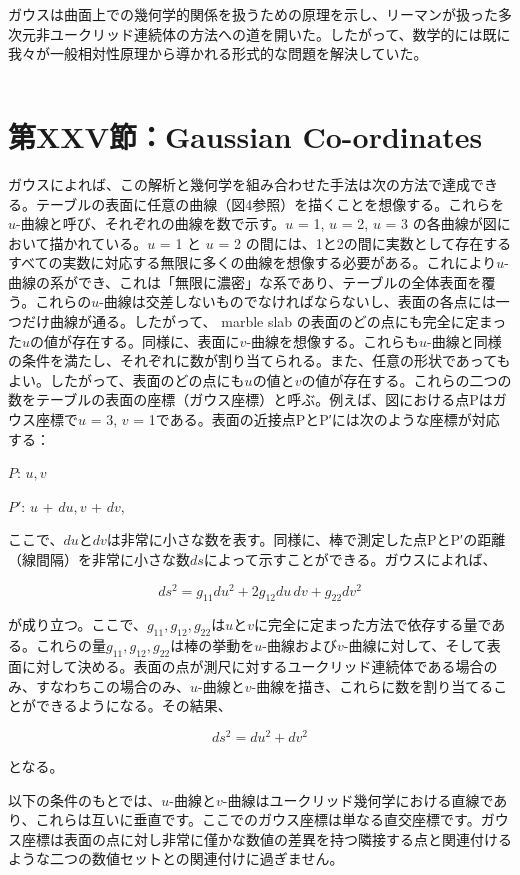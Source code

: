 \documentclass[a4paper,11pt,openany]{ltjsbook}
\begin{document}
ガウスは曲面上での幾何学的関係を扱うための原理を示し、リーマンが扱った多次元非ユークリッド連続体の方法への道を開いた。したがって、数学的には既に我々が一般相対性原理から導かれる形式的な問題を解決していた。

\[ \]


\clearpage
\chapter{第XXV節：Gaussian Co-ordinates}

ガウスによれば、この解析と幾何学を組み合わせた手法は次の方法で達成できる。テーブルの表面に任意の曲線（図4参照）を描くことを想像する。これらを$u$-曲線と呼び、それぞれの曲線を数で示す。$u$ = 1, $u$ = 2, $u$ = 3 の各曲線が図において描かれている。$u$ = 1 と $u$ = 2 の間には、1と2の間に実数として存在するすべての実数に対応する無限に多くの曲線を想像する必要がある。これにより$u$-曲線の系ができ、これは「無限に濃密」な系であり、テーブルの全体表面を覆う。これらの$u$-曲線は交差しないものでなければならないし、表面の各点には一つだけ曲線が通る。したがって、 marble slab の表面のどの点にも完全に定まった$u$の値が存在する。同様に、表面に$v$-曲線を想像する。これらも$u$-曲線と同様の条件を満たし、それぞれに数が割り当てられる。また、任意の形状であってもよい。したがって、表面のどの点にも$u$の値と$v$の値が存在する。これらの二つの数をテーブルの表面の座標（ガウス座標）と呼ぶ。例えば、図における点Pはガウス座標で$u$ = 3, $v$ = 1である。表面の近接点PとP′には次のような座標が対応する：

$P$: $u, v$

$P'$: $u$ + $du, v$ + $dv$,

ここで、$du$と$dv$は非常に小さな数を表す。同様に、棒で測定した点PとP′の距離（線間隔）を非常に小さな数$ds$によって示すことができる。ガウスによれば、

\[ ds^2 = g_{11} du^2 + 2 g_{12} du\, dv + g_{22} dv^2 \]

が成り立つ。ここで、$g_{11}, g_{12}, g_{22}$は$u$と$v$に完全に定まった方法で依存する量である。これらの量$g_{11}, g_{12}, g_{22}$は棒の挙動を$u$-曲線および$v$-曲線に対して、そして表面に対して決める。表面の点が測尺に対するユークリッド連続体である場合のみ、すなわちこの場合のみ、$u$-曲線と$v$-曲線を描き、これらに数を割り当てることができるようになる。その結果、

\[ ds^2 = du^2 + dv^2 \]

となる。

以下の条件のもとでは、$u$-曲線と$v$-曲線はユークリッド幾何学における直線であり、これらは互いに垂直です。ここでのガウス座標は単なる直交座標です。ガウス座標は表面の点に対し非常に僅かな数値の差異を持つ隣接する点と関連付けるような二つの数値セットとの関連付けに過ぎません。
\end{document}
